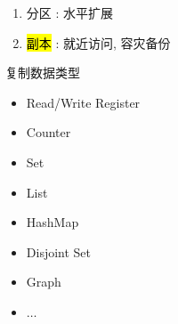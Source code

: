 \begin{frame}{}
  \graphicspath{{tikz/}}
  \begin{figure}[h!]
    \centering
    \begin{adjustbox}{max totalsize = {0.50\textwidth}{1.00\textheight}, center}
      
    \end{adjustbox}
  \end{figure}

  \vspace{0.20cm}
  \begin{center}
    \begin{minipage}{0.65\textwidth}

      \vspace{0.20cm}
      \begin{enumerate}
	\item<2-> 分区 : 水平扩展
	\item<3-> \hl{副本 }: 就近访问, 容灾备份
      \end{enumerate}
    \end{minipage}
  \end{center}
\end{frame}

\begin{frame}{}
  \begin{center}
    \begin{minipage}{0.50\textwidth}
      {\large 复制数据类型}  

      \vspace{0.20cm}
      \begin{itemize}
	\setlength{\itemsep}{4pt}
	\item Read/Write Register
	\item Counter
	\item Set
	\item List
	\item HashMap
	\item Disjoint Set
	\item Graph
	\item $\dots$
      \end{itemize}
    \end{minipage}
  \end{center}
\end{frame}

\begin{frame}{}
  \begin{columns}
      \centerline{\hl{}}
  \end{columns}

  \pause
  \vspace{0.30cm}
  \centerline{}
\end{frame}

